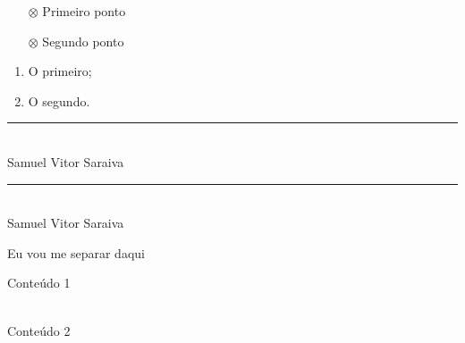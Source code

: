 \documentclass[12pt, a4paper]{article}
\begin{document}
	\begin{itemize}
		\item [$\otimes$] Primeiro ponto
		\item [$\otimes$] Segundo ponto
	\end{itemize}

	\begin{enumerate}
		\item O primeiro;
		\item O segundo.
	\end{enumerate}
	
	\begin{center}
		\rule{10cm}{0.02cm}\\
		Samuel Vitor Saraiva
		
		\vspace{1cm}
		
		\rule{10cm}{0.02cm}\\
		Samuel Vitor Saraiva
	\end{center}

	Eu vou me \hspace{3cm} separar daqui 
	
	
	Conteúdo 1
	
	\dotfill\\
	
	Conteúdo 2
	
	
\end{document}
